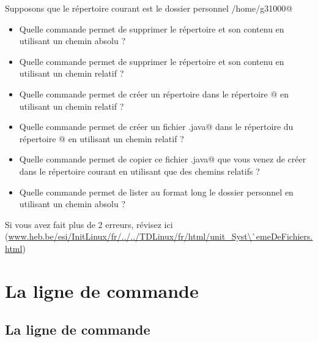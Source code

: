 \documentclass[11pt,a4paper]{article}
\begin{document}
							Supposons que le r\'epertoire courant est le dossier personnel \verb@/home/g31000@
					\begin{itemize}
				
			\item 
										Quelle commande permet de supprimer le r\'epertoire \verb@java@ et son contenu en utilisant un chemin absolu ?
										 \textcolor{gray}{\underline{\hspace*{16em}}} 
			\item 
										Quelle commande permet de supprimer le r\'epertoire \verb@java@ et son contenu en utilisant un chemin relatif ?
										 \textcolor{gray}{\underline{\hspace*{16em}}} 
			\item 
										Quelle commande permet de cr\'eer un r\'epertoire \verb@tds@ 
										dans le r\'epertoire @ en utilisant un chemin relatif ?
										 \textcolor{gray}{\underline{\hspace*{16em}}} 
			\item 
										Quelle commande permet de cr\'eer un fichier \verb@Ex.java@ 
										dans le r\'epertoire \verb@tds@ 
										du r\'epertoire @ en utilisant un chemin relatif ?
										 \textcolor{gray}{\underline{\hspace*{16em}}} 
			\item 
										Quelle commande permet de copier ce fichier \verb@Ex.java@ 
										que vous venez de cr\'eer dans le r\'epertoire courant en utilisant que des chemins relatifs ?
										 \textcolor{gray}{\underline{\hspace*{16em}}} 
			\item 
										Quelle commande permet de lister au format long le dossier personnel en utilisant un chemin absolu ?
										 \textcolor{gray}{\underline{\hspace*{5em}}} 
					\end{itemize}
				Si vous avez fait plus de 2 erreurs, r\'evisez ici (\url{www.heb.be/esi/InitLinux/fr/../../TDLinux/fr/html/unit\_Syst\`emeDeFichiers.html})
            \par
        \section{La ligne de commande}\subsection{La ligne de commande}
			
\end{document}
